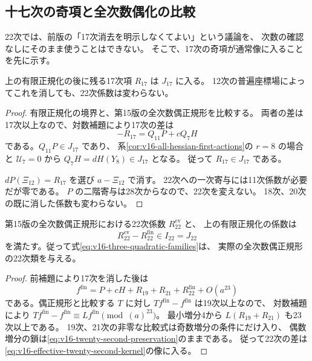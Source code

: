 \subsection{十七次の奇項と全次数偶化の比較}

22次では、前版の「17次消去を明示しなくてよい」という議論を、
次数の確認なしにそのまま使うことはできない。
そこで、17次の奇項が通常像に入ることを先に示す。

\begin{lemma}[残る十七次項の純粋消去]
\label{lem:v16-seventeenth-odd-removal}
上の有限正規化の後に残る17次項 $R_{17}$ は $J_{17}$ に入る。
12次の普遍座標場によってこれを消しても、22次係数は変わらない。
\end{lemma}

\begin{proof}
有限正規化の境界と、第15版の全次数偶正規形を比較する。
両者の差は17次以上なので、対数補題により17次の差は
\[
 -R_{17}=Q_{11}P+cQ_7H
\]
である。$Q_{11}P\in J_{17}$ であり、
系\ref{cor:v16-all-hessian-first-actions}の $r=8$ の場合と
$\mathcal U_7=0$ から $Q_7H=dH(Y_8)\in J_{17}$ となる。
従って $R_{17}\in J_{17}$ である。

$dP(\Xi_{12})=R_{17}$ を選び $a-\Xi_{12}$ で消す。
22次への一次寄与には11次係数が必要だが零である。
$P$ の二階寄与は28次からなので、22次を変えない。
18次、20次の既に消した係数も変わらない。
\end{proof}

\begin{corollary}[二十二次の偶正規形との一致]
\label{cor:v16-evenization-twenty-second-class}
第15版の全次数偶正規形における22次係数 $R_{22}^{\mathrm{ev}}$ と、
上の有限正規化の係数は
\[
 R_{22}^{\mathrm{ev}}-R_{22}^{\mathrm{fin}}\in I_{22}=J_{22}
\]
を満たす。従って式\eqref{eq:v16-three-quadratic-families}は、
実際の全次数偶正規形の22次類を与える。
\end{corollary}

\begin{proof}
前補題により17次を消した後は
\[
 f^{\mathrm{fin}}=P+cH+R_{19}+R_{21}+R_{22}^{\mathrm{fin}}+O(a^{23})
\]
である。偶正規形と比較する $T$ に対し $Tf^{\mathrm{fin}}-f^{\mathrm{fin}}$ は19次以上なので、
対数補題により $Tf^{\mathrm{fin}}-f^{\mathrm{fin}}\equiv Lf^{\mathrm{fin}}\pmod{(a)^{23}}$。
最小増分4から $L(R_{19}+R_{21})$ も23次以上である。
19次、21次の非零な比較式は奇数増分の条件にだけ入り、
偶数増分の鎖は\eqref{eq:v16-twenty-second-preservation}のままである。
従って22次の差は\eqref{eq:v16-effective-twenty-second-kernel}の像に入る。
\end{proof}

